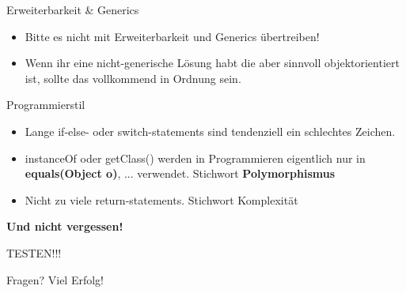 \documentclass[aspectratio=169]{beamer}
\newcommand{\HUMONGOUS}{\Huge}
\begin{document}
\begin{frame}
  \begin{block}{Erweiterbarkeit \& Generics}
    \begin{itemize}
      \pause
      \item Bitte es nicht mit Erweiterbarkeit und Generics übertreiben!
      \pause
      \item Wenn ihr eine nicht-generische Lösung habt die aber sinnvoll objektorientiert ist, sollte das vollkommend in Ordnung sein.
    \end{itemize}
  \end{block}
  \pause
  \begin{block}{Programmierstil}
    \begin{itemize}
      \pause
      \item Lange \color{keywordcolor}if\color{FGround}-\color{keywordcolor}else\color{FGround}- oder \color{keywordcolor}switch\color{FGround}-statements
      sind tendenziell ein schlechtes Zeichen.
      \pause
      \item \color{keywordcolor}instanceOf \color{FGround} oder getClass() werden in Programmieren eigentlich nur in \textbf{equals(Object o)}, ... verwendet.
      Stichwort \textbf{Polymorphismus}
      \pause
      \item Nicht zu viele \color{keywordcolor}return\color{FGround}-statements. Stichwort Komplexität
    \end{itemize}
  \end{block}
\end{frame}

\begin{frame}{\textbf{Und nicht vergessen!}}
  \pause
  \begin{center}\HUMONGOUS TESTEN!!! \end{center}
\end{frame}


\begin{frame}
  \begin{center}\HUMONGOUS Fragen?
    \pause
    \linebreak
    \linebreak
    Viel Erfolg!
  \end{center}
\end{frame}
\end{document}
